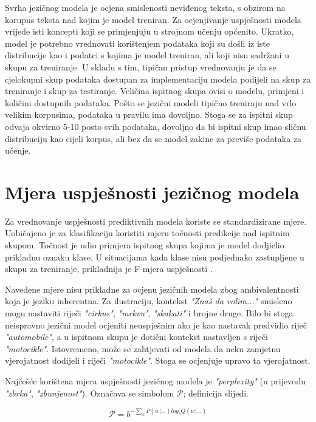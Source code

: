 \documentclass[times, utf8, diplomski, numeric]{fer}
\begin{document}
Svrha jezičnog modela je ocjena smislenosti neviđenog teksta, s obzirom na korupus teksta nad kojim je model treniran. Za ocjenjivanje uspješnosti modela vrijede isti koncepti koji se primjenjuju u strojnom učenju općenito. Ukratko, model je potrebno vrednovati korištenjem podataka koji su došli iz iste distribucije kao i podatci s kojima je model treniran, ali koji nisu sadržani u skupu za treniranje. U skladu s tim, tipičan pristup vrednovanju je da se cjelokupni skup podataka dostupan za implementaciju modela podijeli na skup za treniranje i skup za testiranje. Veličina ispitnog skupa ovisi o modelu, primjeni i količini dostupnih podataka. Pošto se jezični modeli tipično treniraju nad vrlo velikim korpusima, podataka u pravilu ima dovoljno. Stoga se za ispitni skup odvaja okvirno 5-10 posto svih podataka, dovoljno da bi ispitni skup imao sličnu distribuciju kao cijeli korpus, ali bez da se model zakine za previše podataka za učenje.

\section{Mjera uspješnosti jezičnog modela}

Za vrednovanje uspješnosti prediktivnih modela koriste se standardizirane mjere. Uobičajeno je za klasifikaciju koristiti mjeru točnosti predikcije nad ispitnim skupom. Točnost je udio primjera ispitnog skupa kojima je model dodjielio prikladnu oznaku klase. U situacijama kada klase nisu podjednako zastupljene u skupu za treniranje, prikladnija je F-mjera uspješnosti \cite{vanrijsbergen1979information}.

Navedene mjere nisu prikladne za ocjenu jezičnih modela zbog ambivalentnosti koja je jeziku inherentna. Za ilustraciju, kontekst \textit{"Znaš da volim..."} smisleno mogu nastaviti riječi \textit{"cirkus"}, \textit{"mrkvu"}, \textit{"skakati"} i brojne druge. Bilo bi stoga neispravno jezični model ocjeniti neuspješnim ako je kao nastavak predvidio riječ \textit{"automobile"}, a u ispitnom skupu je dotični kontekst nastavljen s riječi \textit{"motocikle"}. Istovremeno, može se zahtjevati od modela da neku zamjetnu vjerojatnost dodijeli i riječi \textit{"motocikle"}. Stoga se ocjenjuje upravo ta vjerojatnost.

Najčešće korištena mjera uspješnosti jezičnog modela je \textit{"perplexity"} (u prijevodu \textit{"zbrka"}, \textit{"zbunjenost"}). Označava se simbolom $\mathcal{P}$; definicija slijedi.

\[
\mathcal{P} = b^{- \sum_x P(w | ...) log_b Q(w | ...)}
\]
\end{document}
